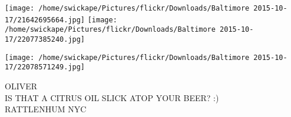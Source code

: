 \documentclass[10pt,letterpaper]{article}
\begin{document}
\texttt{[image: /home/swickape/Pictures/flickr/Downloads/Baltimore 2015-10-17/21642695664.jpg]}
\texttt{[image: /home/swickape/Pictures/flickr/Downloads/Baltimore 2015-10-17/22077385240.jpg]}

\texttt{[image: /home/swickape/Pictures/flickr/Downloads/Baltimore 2015-10-17/22078571249.jpg]}

OLIVER\\
IS THAT A CITRUS OIL SLICK ATOP YOUR BEER? :)\\
RATTLENHUM NYC\\
\pagebreak
\end{document}

